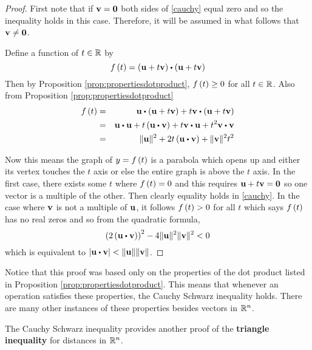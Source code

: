 \begin{proof}
First note that if ${\bf v}={\bf 0}$ both sides of \ref{cauchy}
equal zero and so the inequality holds in this case. Therefore, it will be
assumed in what follows that ${\bf v}\neq {\bf 0}$.

Define a function of $t\in \mathbb{R}$ by 
\begin{equation*}
f\tup{t} =\tup{\vect{u}+t\vect{v}} \dotprod \tup{\vect{u}+
t\vect{v}} 
\end{equation*}
Then by Proposition \ref{prop:propertiesdotproduct}, $f\left(t\right) \geq 0$ for all $t\in \mathbb{R}$.
Also from Proposition \ref{prop:propertiesdotproduct}
\begin{eqnarray*}
f\tup{t} &=&\vect{u}\dotprod \tup{\vect{u}+t\vect{v}} +
t\vect{v}\dotprod \tup{\vect{u}+t\vect{v}} \\
&=&\vect{u}\dotprod \vect{u}+t\tup{\vect{u}\dotprod \vect{v}} + t \vect{v}\dotprod \vect{u}+
t^{2}\vect{v}\dotprod \vect{v} \\
&=&\vectlength \vect{u}\vectlength ^{2}+2t\tup{\vect{u}\dotprod \vect{v}} +\vectlength
\vect{v}\vectlength ^{2}t^{2}
\end{eqnarray*}

Now this means the graph of $y=f\left(t\right) $ is a parabola which opens
up and either its vertex touches the $t$ axis or else the entire graph is
above the $t$ axis. In the first case, there exists some $t$ where $f\left(
t\right) =0$ and this requires ${\bf u}+t{\bf v}={\bf 0}$ so one vector is a
multiple of the other. Then clearly equality holds in \ref{cauchy}. In the
case where ${\bf v}$ is not a multiple of ${\bf u}$, it follows 
$f\left(t\right) >0$ for all $t$ which says $f\left(t\right) $ has no real
zeros and so from the quadratic formula,
\begin{equation*}
\tup{2\tup{\vect{u}\dotprod \vect{v}} } ^{2}-4\vectlength \vect{u}
\vectlength ^{2}\vectlength \vect{v}\vectlength ^{2}<0
\end{equation*}
which is equivalent to $\left\vert \vect{u}\dotprod \vect{v} \right\vert
<\vectlength \vect{u}\vectlength \vectlength \vect{v}\vectlength $.
\end{proof}

Notice that this proof was based only on the properties of
the dot product listed in Proposition \ref{prop:propertiesdotproduct}. This means that
whenever an operation satisfies these properties, the Cauchy Schwarz inequality
holds. There are many other instances of these properties besides vectors in
$\mathbb{R}^{n}$.

The Cauchy Schwarz inequality provides another proof of the \textbf{triangle
inequality} for
distances in $\mathbb{R}^{n}$.

